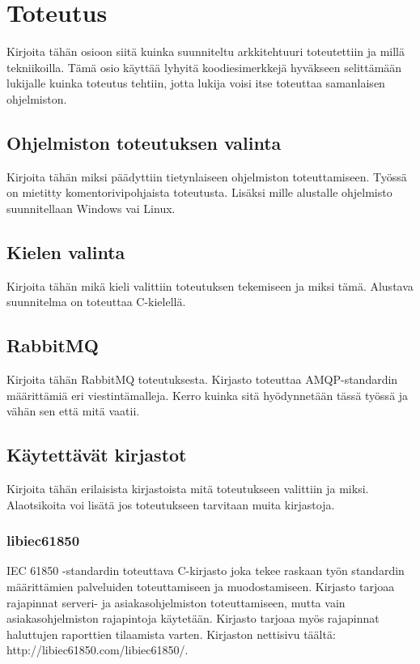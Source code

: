 \chapter{Toteutus}
\label{ch:toteutus}
\begin{it}
	Kirjoita tähän osioon siitä kuinka suunniteltu arkkitehtuuri toteutettiin ja millä tekniikoilla. Tämä osio käyttää lyhyitä koodiesimerkkejä hyväkseen selittämään lukijalle kuinka toteutus tehtiin, jotta lukija voisi itse toteuttaa samanlaisen ohjelmiston.
\end{it}

\section{Ohjelmiston toteutuksen valinta}
\begin{it}
	Kirjoita tähän miksi päädyttiin tietynlaiseen ohjelmiston toteuttamiseen. Työssä on mietitty komentorivipohjaista toteutusta. Lisäksi mille alustalle ohjelmisto suunnitellaan Windows vai Linux.
\end{it}

\section{Kielen valinta}
\begin{it}
	Kirjoita tähän mikä kieli valittiin toteutuksen tekemiseen ja miksi tämä. Alustava suunnitelma on toteuttaa C-kielellä.
\end{it}

\section{RabbitMQ}
\begin{it}
	Kirjoita tähän RabbitMQ toteutuksesta. Kirjasto toteuttaa AMQP-standardin määrittämiä eri viestintämalleja. Kerro kuinka sitä hyödynnetään tässä työssä ja vähän sen että mitä vaatii.
\end{it}

\section{Käytettävät kirjastot}
\begin{it}
	Kirjoita tähän erilaisista kirjastoista mitä toteutukseen valittiin ja miksi. Alaotsikoita voi lisätä jos toteutukseen tarvitaan muita kirjastoja.
\end{it}

\subsection{libiec61850}
\begin{it}
	IEC 61850 -standardin toteuttava C-kirjasto joka tekee raskaan työn standardin määrittämien palveluiden toteuttamiseen ja muodostamiseen. Kirjasto tarjoaa rajapinnat serveri- ja asiakasohjelmiston toteuttamiseen, mutta vain asiakasohjelmiston rajapintoja käytetään. Kirjasto tarjoaa myös rajapinnat haluttujen raporttien tilaamista varten. Kirjaston nettisivu täältä: http://libiec61850.com/libiec61850/.
\end{it}

